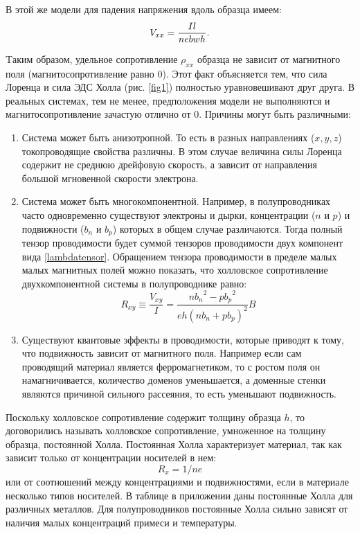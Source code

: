 В этой же модели для падения напряжения вдоль образца имеем:
\begin{equation}
	V_{xx}=\frac{Il}{nebwh}.
	\eqmark{DiagonalVoltage}
\end{equation}

Tаким образом, удельное сопротивление $\rho_{xx}$ образца не зависит от магнитного поля (магнитосопротивление равно 0). Этот факт объясняется тем, что сила Лоренца и сила ЭДС Холла (рис. \ref{fig1}) полностью уравновешивают друг друга. В реальных системах, тем не менее, предположения модели не выполняются и магнитосопротивление зачастую отлично от 0. Причины могут быть различными:
\begin{enumerate}
\item{Система может быть анизотропной. То есть в разных направлениях ($x,y,z$) токопроводящие свойства различны. В этом случае величина силы Лоренца содержит не среднюю дрейфовую скорость, а зависит от направления большой мгновенной скорости электрона.}

\item{Система может быть многокомпонентной. Например, в полупроводниках часто одновременно существуют электроны и дырки, концентрации ($n$ и $p$) и подвижности ($b_n$ и $b_p$) которых в общем случае различаются. Тогда полный тензор проводимости будет суммой тензоров проводимости двух компонент вида \ref{lambdatensor}. Обращением тензора проводимости в пределе малых малых магнитных полей можно показать, что холловское сопротивление двухкомпонентной системы в полупроводнике равно:
      \begin{equation}
      R_{xy}\equiv \frac{V_{xy}}{I}=\frac{n{b_n}^2-p{b_p}^2}{eh(nb_n+pb_p)^2}B
      \label{halltwocomponents}
      \end{equation}
      }

\item{Существуют квантовые эффекты в проводимости, которые приводят к тому, что подвижность зависит от магнитного поля. Например если сам проводящий материал является ферромагнетиком, то с ростом поля он намагничивается, количество доменов уменьшается, а доменные стенки являются причиной сильного рассеяния, то есть уменьшают подвижность. }
\end{enumerate}

Поскольку холловское сопротивление содержит толщину образца $h$, то договорились называть холловское сопротивление, умноженное на толщину образца, постоянной Холла. Постоянная Холла характеризует материал, так как зависит только от концентрации носителей в нем:
$$
R_x=1/ne
$$
 или от соотношений между концентрациями и подвижностями, если в материале несколько типов носителей. В таблице в приложении даны постоянные Холла для различных металлов. Для полупроводников постоянные Холла сильно зависят от наличия малых концентраций примеси и температуры.

